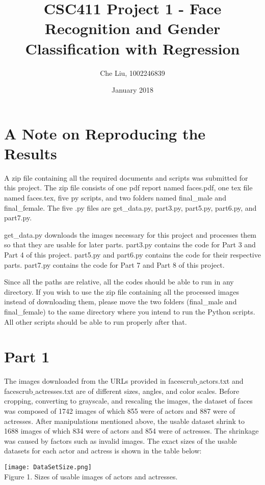 \documentclass{article}
\title{CSC411 Project 1 - Face Recognition and Gender Classification with Regression}
\author{Che Liu, 1002246839}
\date{January 2018}
\begin{document}
\maketitle

\section*{A Note on Reproducing the Results}
A zip file containing all the required documents and scripts was submitted for this project. The zip file consists of one pdf report named faces.pdf, one tex file named faces.tex, five py scripts, and two folders named final\_male and final\_female. The five .py files are get\_data.py, part3.py, part5.py, part6.py, and part7.py. 
\par get\_data.py downloads the images necessary for this project and processes them so that they are usable for later parts. part3.py contains the code for Part 3 and Part 4 of this project. part5.py and part6.py contains the code for their respective parts. part7.py contains the code for Part 7 and Part 8 of this project. 
\par Since all the paths are relative, all the codes should be able to run in any directory. If you wish to use the zip file containing all the processed images instead of downloading them, please move the two folders (final\_male and final\_female) to the same directory where you intend to run the Python scripts. All other scripts should be able to run properly after that.

\section*{Part 1}
The images downloaded from the URLs provided in facescrub$\_$actors.txt and facescrub$\_$actresses.txt are of different sizes, angles, and color scales. Before cropping, converting to grayscale, and rescaling the images, the dataset of faces was composed of 1742 images of which 855 were of actors and 887 were of actresses. After manipulations mentioned above, the usable dataset shrink to 1688 images of which 834 were of actors and 854 were of actresses. The shrinkage was caused by factors such as invalid images. The exact sizes of the usable datasets for each actor and actress is shown in the table below:

\begin{center}
\texttt{[image: DataSetSize.png]}\\
Figure 1. Sizes of usable images of actors and actresses.
\end{center}
\end{document}

